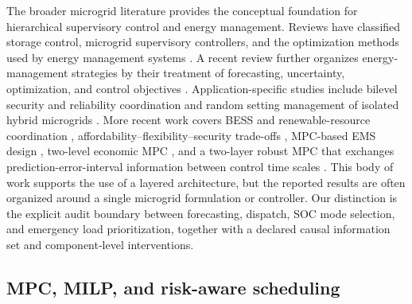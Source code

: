 The broader microgrid literature provides the conceptual foundation for
hierarchical supervisory control and energy management. Reviews have
classified storage control, microgrid supervisory controllers, and the
optimization methods used by energy management systems
\citep{zamora2010controls,meng2016supervisory,zia2018microgrid}. A recent
review further organizes energy-management strategies by their treatment of
forecasting, uncertainty, optimization, and control objectives
\citep{abbasi2023emsreview}. Application-specific studies include bilevel
security and reliability coordination \citep{jokar2022bilevel} and random
setting management of isolated hybrid microgrids
\citep{vergine2022optimal}. More recent work covers BESS and renewable-resource
coordination \citep{onsomu2024bessreview}, affordability--flexibility--security
trade-offs \citep{pamulapati2023trilemma}, MPC-based EMS design
\citep{joshal2023mpcreview,hu2024empc}, two-level economic MPC
\citep{vivas2025hierarchical}, and a two-layer robust MPC that exchanges
prediction-error-interval information between control time scales
\citep{lim2026twolayer}. This body of work supports the use of a layered
architecture, but the reported results are often organized around a single
microgrid formulation or controller. Our distinction is the explicit audit
boundary between forecasting, dispatch, SOC mode selection, and emergency
load prioritization, together with a declared causal information set and
component-level interventions.

\subsection{MPC, MILP, and risk-aware scheduling}

